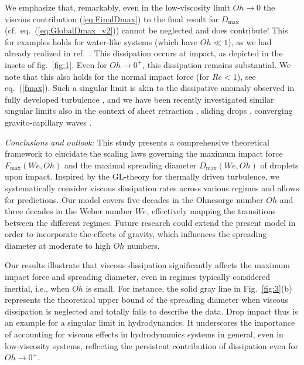 \documentclass[preprint,amssymb,superscriptaddress,aps,prl,floatfix]{revtex4-1}
\begin{document}
We emphasize that, remarkably,
even in the low-viscosity limit $Oh \to 0$ the 
viscous 
contribution  (\ref{eq:FinalDmax}) to the final result for $D_\text{max}$ 
(cf.\ eq.\ (\ref{eq:GlobalDmax_v2})) cannot be neglected and does 
contribute! This for examples holds for 
water-like systems (which have $Oh \ll 1$), 
as we had already realized in ref.\ 
\cite{sanjay_chantelot_lohse_2023}. This dissipation occurs at impact, as depicted in the insets of fig.~\ref{fig:1}. Even 
for $Oh \to 0^+$, this dissipation remains substantial.
We note that this also holds for the normal impact force (for $Re <1$),
see eq.\ (\ref{fmax}). 
Such a singular limit is 
akin to the dissipative anomaly observed in fully developed turbulence \cite{prandtl1904, onsager1949statistical, dubrulle2019beyond, eggers2018role}, and we have  been recently investigated similar
singular limits also 
in the context of  sheet retraction \cite{sanjay2022taylor}, sliding drops \cite{talukdar2024}, converging gravito-capillary waves \cite{kayal2024focusing}. 



{\it Conclusions and outlook:} This study presents a comprehensive theoretical framework to elucidate the scaling laws governing the maximum impact force 
$F_\text{max} (We, Oh)$ 
and the maximal spreading diameter $D_\text{max} (We, Oh) $ of droplets upon impact. 
Inspired by the GL-theory 
for thermally driven turbulence, 
we systematically consider viscous dissipation rates 
across various regimes and allows for predictions. 
Our model covers five decades in the Ohnesorge number $Oh$ and three decades in the Weber number $We$, effectively mapping the transitions between the 
different regimes. 
Future research could  extend  
the present model in order to  incorporate 
the effects of gravity, which  influences 
the spreading diameter at moderate to high $Oh$ numbers. 


Our results illustrate that viscous dissipation significantly affects the maximum impact force and spreading diameter, even in regimes typically considered inertial, i.e., when $Oh$ is small. 
For instance, the solid gray line in Fig.~\ref{fig:3}(b) represents the theoretical upper bound of the spreading diameter when viscous dissipation is neglected and totally fails to describe the data.  
Drop impact thus is an example for a singular limit in hydrodynamics. 
It underscores the importance of accounting for viscous effects in
hydrodynamics systems in general, 
even in low-viscosity systems, reflecting 
the persistent contribution of  
dissipation even  for $Oh \to 0^+$. 
\end{document}

